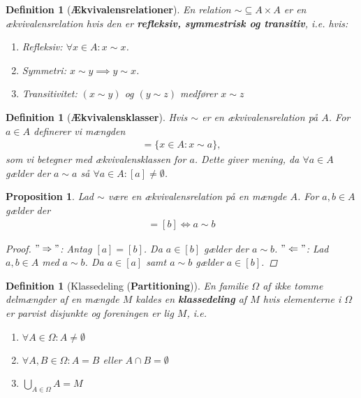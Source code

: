 \documentclass[10pt,twoside,openany,final]{memoir}
\theoremstyle{break}
\newtheorem{proposition}[section]{Proposition}
\newtheorem{definition}[section]{Definition}
\theoremstyle{Break}
\begin{document}
\begin{definition}[\textbf{Ækvivalensrelationer}]
En relation $\sim \subseteq A \times A$ er en ækvivalensrelation hvis den er \textbf{refleksiv, symmestrisk og transitiv}, i.e. hvis:
\begin{enumerate}
\item Refleksiv: $\forall x \in A \colon x \sim x$.
\item Symmetri: $x \sim y \implies y \sim x$.
\item Transitivitet: $(x \sim y)$ og $(y \sim z)$ medfører $x \sim z$
\end{enumerate}
\end{definition}

\begin{definition}[\textbf{Ækvivalensklasser}]
Hvis $\sim$ er en ækvivalensrelation på $A$. For $a \in A$ definerer vi mængden 
\begin{align*}
[a] = \{ x \in A \colon x \sim a\},
\end{align*}
som vi betegner med ækvivalensklassen for $a$. Dette giver mening, da $\forall a \in A$ gælder der $a \sim a$ så  $\forall a \in A \colon [a] \neq \emptyset$.
\end{definition}

\begin{proposition}
Lad $\sim$ være en ækvivalensrelation på en mængde $A$. For $a,b \in A$ gælder der
\begin{align*}
[a]=[b] \iff a \sim b
\end{align*}
\begin{proof}
$" \Rightarrow "$: Antag $[a]=[b]$. Da $a \in [b]$ gælder der $a \sim b$. $"\Leftarrow"$: Lad $a,b \in A$ med $a \sim b$. Da $a \in [a]$ samt $a \sim b$ gælder $a \in [b]$.    
\end{proof}
\end{proposition}

\begin{definition}[Klassedeling (\textbf{Partitioning})]
En familie $\Omega$ af ikke tomme delmængder af en mængde $M$ kaldes en \textbf{klassedeling} af $M$ hvis elementerne i $\Omega$ er parvist disjunkte og foreningen er lig $M$, i.e.
\begin{enumerate}
\item $\forall A \in \Omega \colon A \neq \emptyset$
\item $\forall A,B \in \Omega \colon A=B$ eller $A \cap B = \emptyset$
\item $\displaystyle \bigcup_{ A \in \Omega}A =M$ 
\end{enumerate}
\end{definition}
\end{document}
